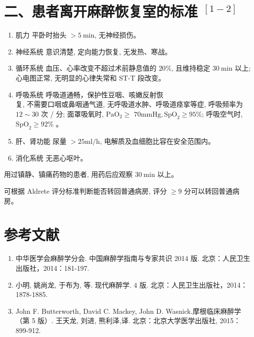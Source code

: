 \documentclass[10pt]{article}
\begin{document}
\section*{二、患者离开麻醉恢复室的标准 ${ }^{[1-2]}$}
\begin{enumerate}
  \item 肌力 平卧时抬头 $>5 \mathrm{~min}$, 无神经损伤。

  \item 神经系统 意识清楚, 定向能力恢复, 无发热、寒战。

  \item 循环系统 血压、心率改变不超过术前静息值的 $20 \%$, 且维持稳定 $30 \mathrm{~min}$ 以上; 心电图正常, 无明显的心律失常和 ST-T 段改变。

  \item 呼吸系统 呼吸道通畅，保护性豆咽、咳嫩反射恢\\
复, 不需要口咽或鼻咽通气道, 无呼吸道水肿、呼吸道痉挛等症, 呼吸频率为 $12 \sim 30$ 次 / 分; 面罩吸氧时, $\mathrm{PaO}_{2} \geqslant$ $70 \mathrm{mmHg}, \mathrm{SpO}_{2} \geqslant 95 \%$; 呼吸空气时, $\mathrm{SpO}_{2} \geqslant 92 \%$ 。

  \item 肝、肾功能 尿量 $>25 \mathrm{ml} / \mathrm{h}$, 电解质及血细胞比容在安全范围内。

  \item 消化系统 无恶心呕叶。

\end{enumerate}

用过镇静、镇痛药物的患者, 用药后应观察 $30 \mathrm{~min}$ 以上。

可根据 Aldrete 评分标准判断能否转回普通病房, 评分 $\geqslant 9$ 分可以转回普通病房。

\section*{参考文献}
\begin{enumerate}
  \item 中华医学会麻醉学分会. 中国麻醉学指南与专家共识 2014 版. 北京：人民卫生出版社，2014：181-197.

  \item 小明, 姚尚龙, 于布为, 等. 现代麻醉学. 4 版. 北京：人民卫生出版社，2014：1878-1885.

  \item John F. Butterworth, David C. Mackey, John D. Wasnick.摩根临床麻醉学（第 5 版）. 王天龙, 刘进, 熊利泽,译. 北京：北京大学医学出版社, 2015：899-912.

\end{enumerate}
\end{document}
